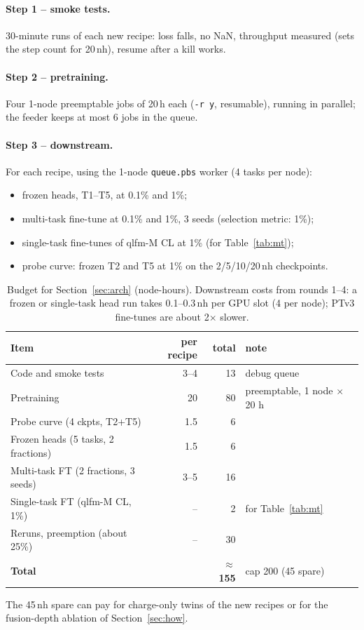 \documentclass[11pt,a4paper]{article}
\newcommand{\code}[1]{\texttt{\small #1}}
\begin{document}
\paragraph{Step 1 -- smoke tests.} 30-minute runs of each new recipe: loss falls, no NaN, throughput measured (sets the step count for 20\,nh), resume after a kill works.

\paragraph{Step 2 -- pretraining.} Four 1-node preemptable jobs of 20\,h each (\code{-r y}, resumable), running in parallel; the feeder keeps at most 6 jobs in the queue.

\paragraph{Step 3 -- downstream.} For each recipe, using the 1-node \code{queue.pbs} worker (4 tasks per node):
\begin{itemize}
  \item frozen heads, T1--T5, at 0.1\% and 1\%;
  \item multi-task fine-tune at 0.1\% and 1\%, 3 seeds (selection metric: 1\%);
  \item single-task fine-tunes of qlfm-M CL at 1\% (for Table~\ref{tab:mt});
  \item probe curve: frozen T2 and T5 at 1\% on the 2/5/10/20\,nh checkpoints.
\end{itemize}

\begin{table}[H]\centering\small
\caption{Budget for Section~\ref{sec:arch} (node-hours). Downstream costs from rounds 1--4: a frozen or single-task head run takes 0.1--0.3\,nh per GPU slot (4 per node); PTv3 fine-tunes are about 2$\times$ slower.}\label{tab:budget}
\begin{tabular}{lrrl}\toprule
Item & per recipe & total & note\\\midrule
Code and smoke tests & 3--4 & 13 & debug queue\\
Pretraining & 20 & 80 & preemptable, 1 node $\times$ 20 h\\
Probe curve (4 ckpts, T2+T5) & 1.5 & 6 & \\
Frozen heads (5 tasks, 2 fractions) & 1.5 & 6 & \\
Multi-task FT (2 fractions, 3 seeds) & 3--5 & 16 & \\
Single-task FT (qlfm-M CL, 1\%) & -- & 2 & for Table~\ref{tab:mt}\\
Reruns, preemption (about 25\%) & -- & 30 & \\\midrule
\textbf{Total} & & \textbf{$\approx$155} & cap 200 (45 spare)\\
\bottomrule\end{tabular}
\end{table}
The 45\,nh spare can pay for charge-only twins of the new recipes or for the fusion-depth ablation of Section~\ref{sec:how}.
\end{document}
